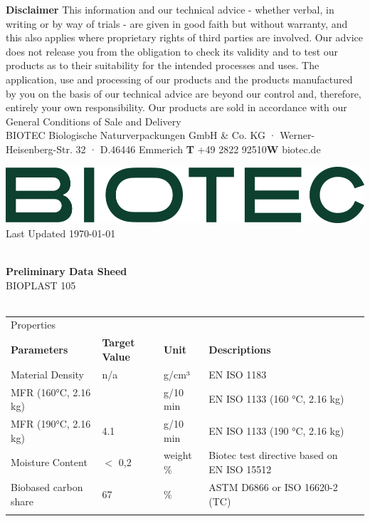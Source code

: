 \documentclass{article}
\begin{document}
\vspace*{\fill}
{\scriptsize
        \textbf{Disclaimer} This information and our technical advice - whether verbal, in writing or by way of trials - are given in good faith but without warranty, and this also applies where proprietary rights of third parties are involved. Our advice does not release you from the obligation to check its validity and to test our products as to their suitability for the intended processes and uses. The application, use and processing of our products and the products manufactured by you on the basis of our technical advice are beyond our control and, therefore, entirely your own responsibility. Our products are sold in accordance with our General Conditions of Sale and Delivery \\ 
 BIOTEC Biologische Naturverpackungen GmbH \& Co. KG · Werner-Heisenberg-Str. 32 · D.46446 Emmerich \hfill \textbf{T} +49 2822 92510\qquad \textbf{W} biotec.de}
\clearpage
\begin{flushleft}
\includegraphics[scale=0.20]{biotec}
\hfill\tiny Last Updated \today
\end{flushleft}
\begin{flushleft}
\hspace{1cm}\\
\textbf{Preliminary Data Sheed}\\
BIOPLAST 105\\
\hspace{1cm}\\
\end{flushleft}
\begin{center}
\begin{tabularx}
{\textwidth}{X l  l  l  l }\rowcolor{color_title}Properties &  &  &  &  \\
\textbf{Parameters} & \textbf{Target Value} & \textbf{Unit} & \textbf{Descriptions} &  \\
Material Density  & n/a & g/cm³ & EN ISO 1183 &  \\
\arrayrulecolor{line_color}\hline
MFR (160°C, 2.16 kg) &   & g/10 min & EN ISO 1133 (160 °C, 2.16 kg) &  \\
\arrayrulecolor{line_color}\hline
MFR (190°C, 2.16 kg) & 4.1 & g/10 min & EN ISO 1133 (190 °C, 2.16 kg) &  \\
\arrayrulecolor{line_color}\hline
Moisture Content & \(<\) 0,2 & weight \% & Biotec test directive based on EN ISO 15512 &  \\
\arrayrulecolor{line_color}\hline
Biobased carbon share & 67 & \% & ASTM D6866 or ISO 16620-2 (TC) &  \\
\arrayrulecolor{line_color}\hline

\end{tabularx}
\end{center}
\end{document}

